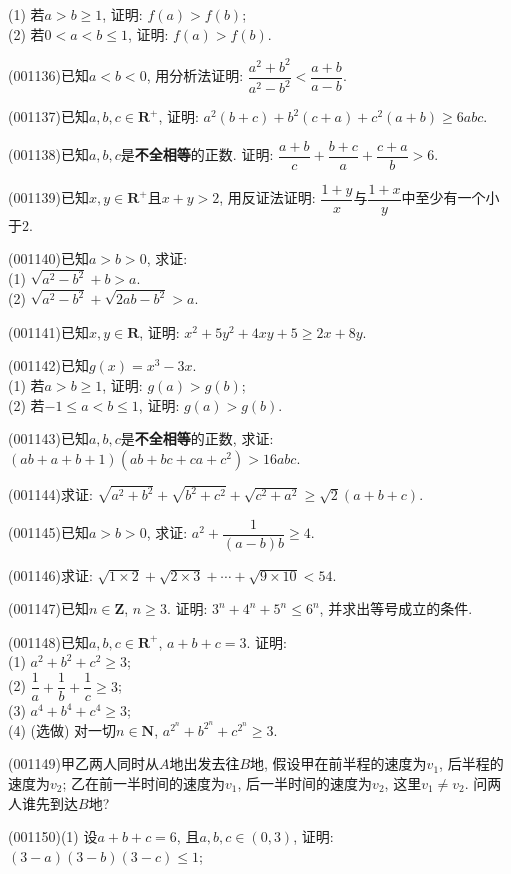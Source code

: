 (1) 若$a>b\ge 1$, 证明: $f(a)>f(b)$;\\ 
(2) 若$0<a<b\le 1$, 证明: $f(a)>f(b)$.
\item (001136)已知$a<b<0$, 用分析法证明: $\dfrac{a^2+b^2}{a^2-b^2}<\dfrac{a+b}{a-b}$.
\item (001137)已知$a,b,c\in \mathbf{R}^+$, 证明: $a^2(b+c)+b^2(c+a)+c^2(a+b)\ge 6abc$.
\item (001138)已知$a,b,c$是{\bf 不全相等}的正数. 证明: $\dfrac{a+b}{c}+\dfrac{b+c}{a}+\dfrac{c+a}{b}>6$.
\item (001139)已知$x,y\in \mathbf{R}^+$且$x+y>2$, 用反证法证明: $\dfrac{1+y}{x}$与$\dfrac{1+x}{y}$中至少有一个小于$2$.
\item (001140)已知$a>b>0$, 求证: \\ 
(1) $\sqrt{a^2-b^2}+b>a$.\\ 
(2) $\sqrt{a^2-b^2}+\sqrt{2ab-b^2}>a$.
\item (001141)已知$x,y\in \mathbf{R}$, 证明: $x^2+5y^2+4xy+5\ge 2x+8y$.
\item (001142)已知$g(x)=x^3-3x$.\\ 
(1) 若$a>b\ge 1$, 证明: $g(a)>g(b)$;\\ 
(2) 若$-1\le a<b\le 1$, 证明: $g(a)>g(b)$.
\item (001143)已知$a,b,c$是{\bf 不全相等}的正数, 求证: $(ab+a+b+1)(ab+bc+ca+c^2)> 16abc$.
\item (001144)求证: $\sqrt{a^2+b^2}+\sqrt{b^2+c^2}+\sqrt{c^2+a^2}\geq \sqrt{2}(a+b+c)$.
\item (001145)已知$a>b>0$, 求证: $a^2+\dfrac{1}{(a-b)b}\ge 4$.
\item (001146)求证: $\sqrt{1\times2}+\sqrt{2\times3}+\cdots+\sqrt{9\times10}<54$.
\item (001147)已知$n\in\mathbf{Z}$, $n \ge 3$. 证明: $3^n+4^n+5^n\le 6^n$, 并求出等号成立的条件.
\item (001148)已知$a,b,c\in \mathbf{R}^+$, $a+b+c=3$. 证明:\\ 
(1) $a^2+b^2+c^2\ge 3$;\\ 
(2) $\dfrac1a+\dfrac1b+\dfrac1c\ge 3$;\\ 
(3) $a^4+b^4+c^4\ge 3$;\\ 
(4) (选做) 对一切$n\in \mathbf{N}$, $a^{2^n}+b^{2^n}+c^{2^n}\ge 3$.
\item (001149)甲乙两人同时从$A$地出发去往$B$地, 假设甲在前半程的速度为$v_1$, 后半程的速度为$v_2$; 乙在前一半时间的速度为$v_1$, 后一半时间的速度为$v_2$, 这里$v_1\ne v_2$. 问两人谁先到达$B$地?
\item (001150)(1) 设$a+b+c=6$, 且$a,b,c\in(0,3)$, 证明: $(3-a)(3-b)(3-c)\le 1$;\\ 

